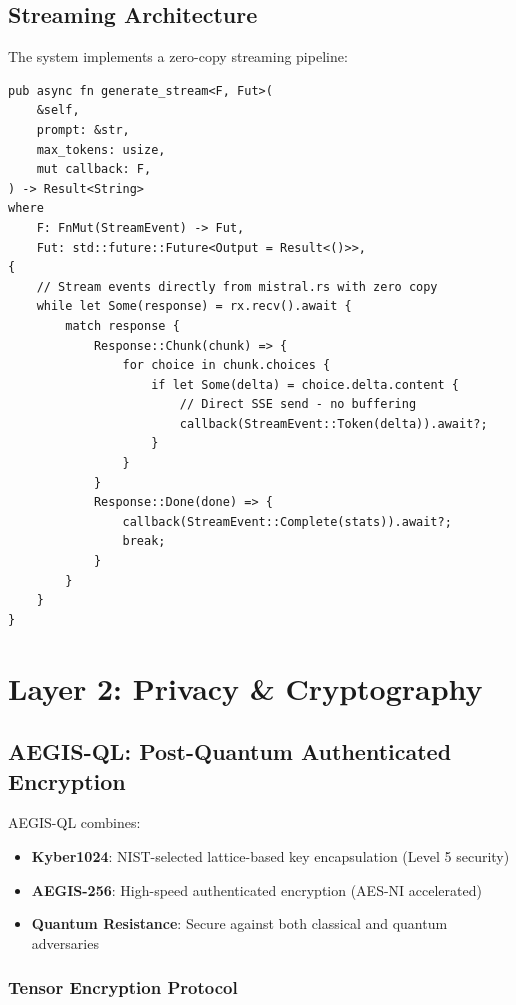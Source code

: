 \documentclass[11pt,a4paper]{article}
\begin{document}
\subsection{Streaming Architecture}

The system implements a zero-copy streaming pipeline:

\begin{lstlisting}[caption={Rust: Zero-Copy SSE Token Streaming}, label=lst:streaming]
pub async fn generate_stream<F, Fut>(
    &self,
    prompt: &str,
    max_tokens: usize,
    mut callback: F,
) -> Result<String>
where
    F: FnMut(StreamEvent) -> Fut,
    Fut: std::future::Future<Output = Result<()>>,
{
    // Stream events directly from mistral.rs with zero copy
    while let Some(response) = rx.recv().await {
        match response {
            Response::Chunk(chunk) => {
                for choice in chunk.choices {
                    if let Some(delta) = choice.delta.content {
                        // Direct SSE send - no buffering
                        callback(StreamEvent::Token(delta)).await?;
                    }
                }
            }
            Response::Done(done) => {
                callback(StreamEvent::Complete(stats)).await?;
                break;
            }
        }
    }
}
\end{lstlisting}

\newpage
\section{Layer 2: Privacy \& Cryptography}

\subsection{AEGIS-QL: Post-Quantum Authenticated Encryption}

AEGIS-QL combines:
\begin{itemize}
    \item \textbf{Kyber1024}: NIST-selected lattice-based key encapsulation (Level 5 security)
    \item \textbf{AEGIS-256}: High-speed authenticated encryption (AES-NI accelerated)
    \item \textbf{Quantum Resistance}: Secure against both classical and quantum adversaries
\end{itemize}

\subsubsection{Tensor Encryption Protocol}
\end{document}
